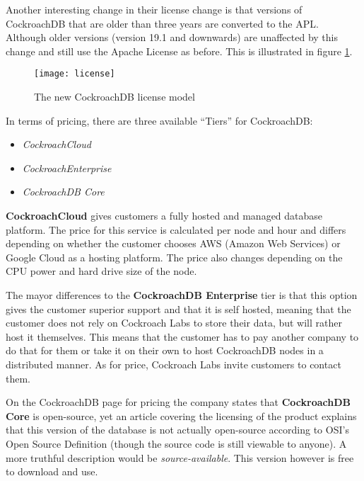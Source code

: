 \medskip
Another interesting change in their license change is that versions of CockroachDB that are older than three years are converted to the APL. Although older versions (version 19.1 and downwards) are unaffected by this change and still use the Apache License as before. This is illustrated in figure \ref{fig:license}.

\begin{figure}[H]
    \texttt{[image: license]}
    \caption{The new CockroachDB license model\cite{cockroach-license}}
    \label{fig:license}
\end{figure}


\bigskip
In terms of pricing, there are three available \enquote{Tiers} for CockroachDB:
\begin{itemize}
    \item \emph{CockroachCloud}
	\item \emph{CockroachEnterprise}
	\item \emph{CockroachDB Core}
\end{itemize}

\textbf{CockroachCloud} gives customers a fully hosted and managed database platform. 
The price for this service is calculated per node and hour and differs depending on whether the customer chooses AWS (Amazon Web Services) or Google Cloud as a hosting platform.
The price also changes depending on the CPU power and hard drive size of the node.
\cite{cockroach-pricing}

\medskip
The mayor differences to the \textbf{CockroachDB Enterprise} tier is that this option gives the customer superior support and that it is self hosted, meaning that the customer does not rely on Cockroach Labs to store their data, but will rather host it themselves. This means that the customer has to pay another company to do that for them or take it on their own to host CockroachDB nodes in a distributed manner.
As for price, Cockroach Labs invite customers to contact them.
\cite{cockroach-pricing}

\medskip
On the CockroachDB page for pricing the company states that \textbf{CockroachDB Core} is open-source,\cite{cockroach-pricing} yet an article covering the licensing of the product explains that this version of the database is not actually open-source according to OSI’s Open Source Definition (though the source code is still viewable to anyone).\cite{cockroach-license}
A more truthful description would be \emph{source-available}.
This version however is free to download and use. 
